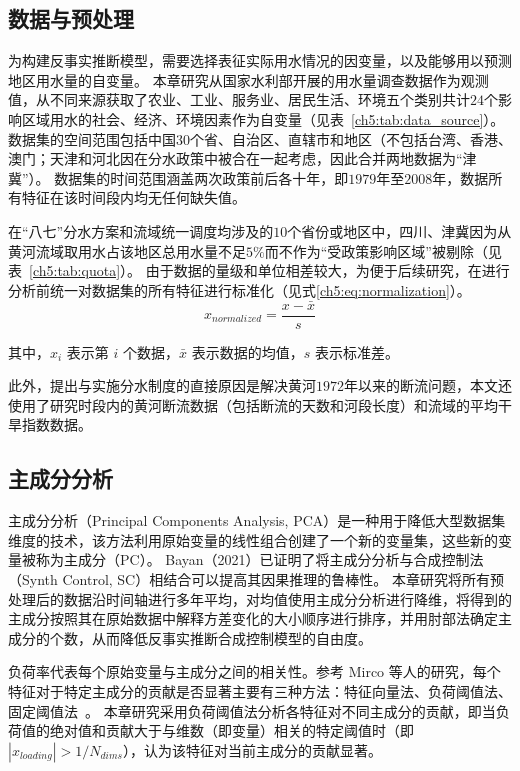\subsection{数据与预处理}\label{sec:dataset}

为构建反事实推断模型，需要选择表征实际用水情况的因变量，以及能够用以预测地区用水量的自变量。
本章研究从国家水利部开展的用水量调查数据作为观测值，从不同来源获取了农业、工业、服务业、居民生活、环境五个类别共计$24$个影响区域用水的社会、经济、环境因素作为自变量\cite{zhou2020}（见表~\ref{ch5:tab:data_source}）。
数据集的空间范围包括中国$30$个省、自治区、直辖市和地区（不包括台湾、香港、澳门；天津和河北因在分水政策中被合在一起考虑，因此合并两地数据为“津冀”）。
数据集的时间范围涵盖两次政策前后各十年，即$1979$年至$2008$年，数据所有特征在该时间段内均无任何缺失值。



在``八七''分水方案和流域统一调度均涉及的$10$个省份或地区中，四川、津冀因为从黄河流域取用水占该地区总用水量不足$5\%$而不作为“受政策影响区域”被剔除（见表~\ref{ch5:tab:quota}）。
由于数据的量级和单位相差较大，为便于后续研究，在进行分析前统一对数据集的所有特征进行标准化（见式\ref{ch5:eq:normalization}）。
\begin{equation}
    x_{\textit{normalized}}=\frac{x-\bar{x}}{s}
    \label{ch5:eq:normalization}
\end{equation}

其中，$x_i$ 表示第 $i$ 个数据，$\bar{x}$ 表示数据的均值，$s$ 表示标准差。

此外，提出与实施分水制度的直接原因是解决黄河$1972$年以来的断流问题\cite{wang2019b}，本文还使用了研究时段内的黄河断流数据（包括断流的天数和河段长度）和流域的平均干旱指数数据\cite{wang2022e}。

\subsection{主成分分析}

主成分分析（Principal Components Analysis, PCA）是一种用于降低大型数据集维度的技术，该方法利用原始变量的线性组合创建了一个新的变量集，这些新的变量被称为主成分（PC）。
Bayan（2021）\cite{bayani2021}已证明了将主成分分析与合成控制法（Synth Control, SC）相结合可以提高其因果推理的鲁棒性。
本章研究将所有预处理后的数据沿时间轴进行多年平均，对均值使用主成分分析进行降维，将得到的主成分按照其在原始数据中解释方差变化的大小顺序进行排序，并用肘部法确定主成分的个数，从而降低反事实推断合成控制模型的自由度。

负荷率代表每个原始变量与主成分之间的相关性。参考 Mirco 等人的研究，每个特征对于特定主成分的贡献是否显著主要有三种方法：特征向量法、负荷阈值法、固定阈值法~\cite{migliavacca2021}。
本章研究采用负荷阈值法分析各特征对不同主成分的贡献，即当负荷值的绝对值和贡献大于与维数（即变量）相关的特定阈值时（即$|{x_{loading}}| > 1/N_{dims}$），认为该特征对当前主成分的贡献显著。


